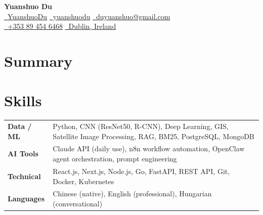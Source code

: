 \documentclass{simpleresume}
\begin{document}
\begin{center}
  {\Large\sffamily\bfseries\color{namecolor} Yuanshuo Du}\\[0.10cm]
  {\sffamily\small
    \href{https://github.com/YuanshuoDu}{\color{accent}\faGithub\color{muted}\ YuanshuoDu}
    \quad\textbullet\quad
    \href{https://linkedin.com/in/yuanshuodu}{\color{accent}\faLinkedin\color{muted}\ yuanshuodu}
    \quad\textbullet\quad
    \href{https://mail.google.com/mail/?view=cm&to=duyuanshuo@gmail.com}{\color{accent}\faEnvelope\color{muted}\ duyuanshuo@gmail.com}
  }\\[0.05cm]
  {\sffamily\small\color{muted}
    \href{tel:+353894546468}{\color{accent}\faPhone\color{muted}\ +353 89 454 6468}
    \quad\textemdash\quad
    \href{https://www.google.com/maps/place/Dublin,+Ireland}{\color{accent}\faMapMarker\ Dublin, Ireland}
  }
\end{center}
\headerrule

\section{Summary}
\vspace{-0.05cm}
\vspace{-0.08cm}

\section{Skills}
\noindent
\begin{tabular}{p{2.4cm}p{14.0cm}}
\textbf{Data / ML} & Python, CNN (ResNet50, R-CNN), Deep Learning, GIS, Satellite Image Processing, RAG, BM25, PostgreSQL, MongoDB \\[-3pt]
\textbf{AI Tools} & Claude API (daily use), n8n workflow automation, OpenClaw agent orchestration, prompt engineering \\[-3pt]
\textbf{Technical} & React.js, Next.js, Node.js, Go, FastAPI, REST API, Git, Docker, Kubernetes \\[-3pt]
\textbf{Languages} & Chinese (native), English (professional), Hungarian (conversational) \\
\end{tabular}
\vspace{0.03cm}
\end{document}
